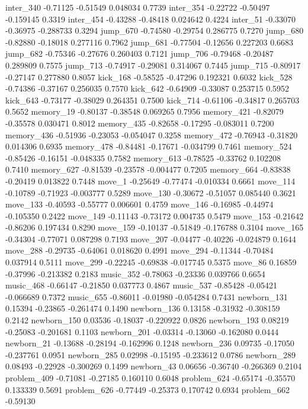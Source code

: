 \documentclass[10pt, letterpaper]{article}
\begin{document}
inter\_340 -0.71125 -0.51549 0.048034 0.7739 inter\_354 -0.22722
-0.50497 -0.159145 0.3319 inter\_454 -0.43288 -0.48418 0.024642 0.4224
inter\_51 -0.33070 -0.36975 -0.288733 0.3294 jump\_670 -0.74580 -0.29754
0.286775 0.7270 jump\_680 -0.82880 -0.18018 0.277116 0.7962 jump\_681
-0.77504 -0.12656 0.227203 0.6683 jump\_682 -0.75346 -0.27676 0.260403
0.7121 jump\_706 -0.79468 -0.20487 0.289809 0.7575 jump\_713 -0.74917
-0.29081 0.314067 0.7445 jump\_715 -0.80917 -0.27147 0.277880 0.8057
kick\_168 -0.58525 -0.47296 0.192321 0.6032 kick\_528 -0.74386 -0.37167
0.256035 0.7570 kick\_642 -0.64909 -0.33087 0.253715 0.5952 kick\_643
-0.73177 -0.38029 0.264351 0.7500 kick\_714 -0.61106 -0.34817 0.265703
0.5652 memory\_19 -0.80137 -0.38548 0.069265 0.7956 memory\_421 -0.82079
-0.35578 0.030471 0.8012 memory\_435 -0.82658 -0.17295 -0.083011 0.7200
memory\_436 -0.51936 -0.23053 -0.054047 0.3258 memory\_472 -0.76943
-0.31820 0.014306 0.6935 memory\_478 -0.84481 -0.17671 -0.034799 0.7461
memory\_524 -0.85426 -0.16151 -0.048335 0.7582 memory\_613 -0.78525
-0.33762 0.102208 0.7410 memory\_627 -0.81539 -0.23578 -0.004477 0.7205
memory\_664 -0.83838 -0.20419 0.013822 0.7448 move\_1 -0.25649 -0.77474
-0.010334 0.6661 move\_114 -0.10789 -0.71923 -0.003777 0.5289 move\_130
-0.30672 -0.51057 0.085440 0.3621 move\_133 -0.40593 -0.55777 0.006601
0.4759 move\_146 -0.16985 -0.44974 -0.105350 0.2422 move\_149 -0.11143
-0.73172 0.004735 0.5479 move\_153 -0.21642 -0.86206 0.197434 0.8290
move\_159 -0.10137 -0.51849 -0.176788 0.3104 move\_165 -0.34304 -0.77071
0.087298 0.7193 move\_207 -0.04477 -0.40226 -0.024879 0.1644 move\_288
-0.29735 -0.64061 0.018620 0.4991 move\_294 -0.11344 -0.70484 0.037914
0.5111 move\_299 -0.22245 -0.69838 -0.017745 0.5375 move\_86 0.16859
-0.37996 -0.213382 0.2183 music\_352 -0.78063 -0.23336 0.039766 0.6654
music\_468 -0.66147 -0.21850 0.037773 0.4867 music\_537 -0.85428
-0.05421 -0.066689 0.7372 music\_655 -0.86011 -0.01980 -0.054284 0.7431
newborn\_131 0.15394 -0.23865 -0.261474 0.1490 newborn\_136 0.13158
-0.31932 -0.308159 0.2142 newborn\_150 0.03536 -0.18037 -0.220922 0.0826
newborn\_193 0.08219 -0.25083 -0.201681 0.1103 newborn\_201 -0.03314
-0.13060 -0.162080 0.0444 newborn\_21 -0.13688 -0.28194 -0.162996 0.1248
newborn\_236 0.09735 -0.17050 -0.237761 0.0951 newborn\_285 0.02998
-0.15195 -0.233612 0.0786 newborn\_289 0.08493 -0.22928 -0.300269 0.1499
newborn\_43 0.06656 -0.36740 -0.266369 0.2104 problem\_409 -0.71081
-0.27185 0.160110 0.6048 problem\_624 -0.65174 -0.35570 0.133339 0.5691
problem\_626 -0.77449 -0.25373 0.170742 0.6934 problem\_662 -0.59130
\end{document}
